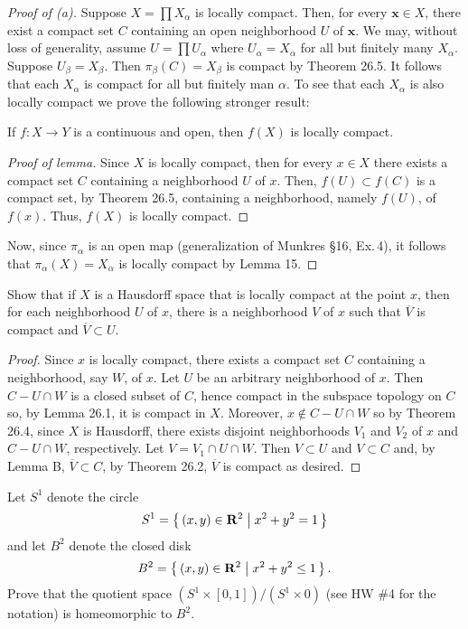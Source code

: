 \begin{proof}[Proof of (a)]
Suppose $X=\prod X_\alpha$ is locally compact. Then, for every
$\mathbf{x}\in X$, there exist a compact set $C$ containing an open
neighborhood $U$ of $\mathbf{x}$. We may, without loss of generality,
assume $U=\prod U_\alpha$ where $U_\alpha=X_\alpha$ for all but
finitely many $X_\alpha$. Suppose $U_\beta=X_\beta$. Then
$\pi_\beta(C)=X_\beta$ is compact by Theorem 26.5. It follows that
each $X_\alpha$ is compact for all but finitely man $\alpha$. To see
that each $X_\alpha$ is also locally compact we prove the following
stronger result:
\begin{lemma}[Munkres \S20, Ex.\,3]
If $f\colon X\to Y$ is a continuous and open, then $f(X)$ is locally
compact.
\end{lemma}
\begin{proof}[Proof of lemma]
\renewcommand\qedsymbol{$\clubsuit$}
Since $X$ is locally compact, then for every $x\in X$ there exists a
compact set $C$ containing a neighborhood $U$ of $x$. Then,
$f(U)\subset f(C)$ is a compact set, by Theorem 26.5, containing a
neighborhood, namely $f(U)$, of $f(x)$. Thus, $f(X)$ is locally compact.
\end{proof}
Now, since $\pi_\alpha$ is an open map (generalization of Munkres
\S16, Ex.\,4), it follows that $\pi_\alpha(X)=X_\alpha$ is locally
compact by Lemma 15.
\end{proof}
\newpage
\begin{problem}[Munkres \S29, Ex.\,10]
Show that if $X$ is a Hausdorff space that is locally compact at
the point $x$, then for each neighborhood $U$ of $x$, there is a
neighborhood $V$ of $x$ such that $\overline V$ is compact and
$\overline V\subset U$.
\end{problem}
\begin{proof}
Since $x$ is locally compact, there exists a compact set $C$
containing a neighborhood, say $W$, of $x$. Let $U$ be an
arbitrary neighborhood of $x$. Then $C-U\cap W$ is a closed
subset of $C$, hence compact in the subspace topology on $C$ so,
by Lemma 26.1, it is compact in $X$. Moreover, $x\notin C-U\cap
W$ so by Theorem 26.4, since $X$ is Hausdorff, there exists
disjoint neighborhoods $V_1$ and $V_2$ of $x$ and $C-U\cap W$,
respectively. Let $V=V_1\cap U\cap W$. Then $V\subset U$ and
$V\subset C$ and, by Lemma B, $\overline V\subset C$, by Theorem
26.2, $\overline V$ is compact as desired.
\end{proof}
\newpage
\begin{problem}[A]
Let $S^1$ denote the circle
\[
S^1=\left\{\,(x,y)\in\mathbf{R}^2\;\middle|\;x^2+y^2=1\,\right\}
\]
and let $B^2$ denote the closed disk
\[
B^2=\left\{\,(x,y)\in\mathbf{R}^2\;\middle|\;x^2+y^2\leq 1\,\right\}.
\]
Prove that the quotient space $(S^1\times[0,1])/(S^1\times 0)$
(see HW \#4 for the notation) is homeomorphic to $B^2$.
\end{problem}
